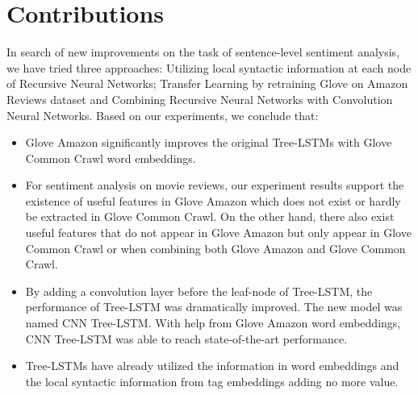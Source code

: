 \section{Contributions}
In search of new improvements on the task of sentence-level sentiment analysis, we have tried three approaches: Utilizing local syntactic information at each node of Recursive Neural Networks; Transfer Learning by retraining Glove on Amazon Reviews dataset and Combining Recursive Neural Networks with Convolution Neural Networks.
Based on our experiments, we conclude that:
\begin{itemize}
\item Glove Amazon significantly improves the original Tree-LSTMs with Glove Common Crawl word embeddings.

\item For sentiment analysis on movie reviews, our experiment results support the existence of useful features in Glove Amazon which does not exist or hardly be extracted in Glove Common Crawl.
On the other hand, there also exist useful features that do not appear in Glove Amazon but only appear in Glove Common Crawl or when combining both Glove Amazon and Glove Common Crawl.

\item By adding a convolution layer before the leaf-node of Tree-LSTM, the performance of Tree-LSTM was dramatically improved.
The new model was named CNN Tree-LSTM. 
With help from Glove Amazon word embeddings, CNN Tree-LSTM was able to reach state-of-the-art performance.

\item  Tree-LSTMs have already utilized the information in word embeddings and the local syntactic information from tag embeddings adding no more value.
\end{itemize}

